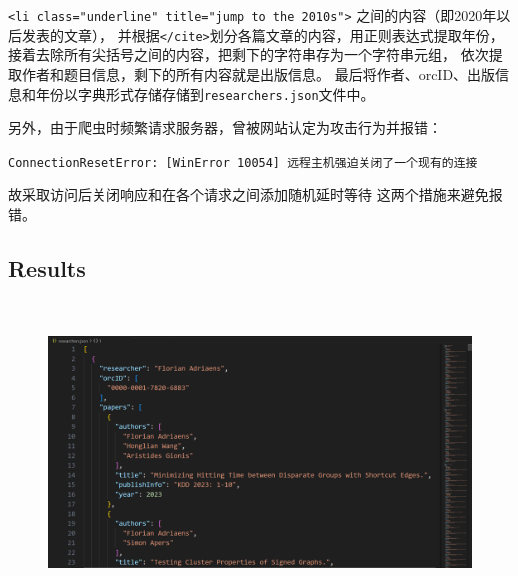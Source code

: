 \documentclass{ctexart}
\begin{document}
	\verb|<li class="underline" title="jump to the 2010s">| 之间的内容（即2020年以后发表的文章），
	并根据\verb|</cite>|划分各篇文章的内容，用正则表达式提取年份，
	接着去除所有尖括号之间的内容，把剩下的字符串存为一个字符串元组，
	依次提取作者和题目信息，剩下的所有内容就是出版信息。
	最后将作者、orcID、出版信息和年份以字典形式存储存储到\verb|researchers.json|文件中。

	另外，由于爬虫时频繁请求服务器，曾被网站认定为攻击行为并报错：
	
	\verb|ConnectionResetError: [WinError 10054] 远程主机强迫关闭了一个现有的连接|

	故采取访问后关闭响应和在各个请求之间添加随机延时等待
这两个措施来避免报错。	
\subsection{Results}
\begin{figure}[H]
	\centering 
	\includegraphics[height=8cm,width=14cm]{4.png}
	\end{figure}
\end{document}
